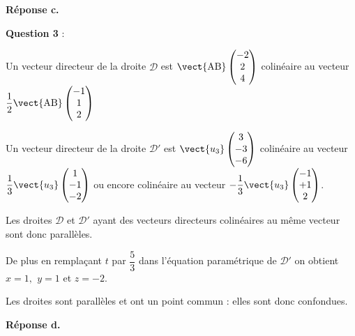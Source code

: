 \hfill\textbf{Réponse c.}

\medskip


\textbf{Question 3} : %

Un vecteur directeur de la droite $\mathcal{D}$ est $\vect{\text{AB}}\begin{pmatrix}-2\\2\\4\end{pmatrix}$ colinéaire au vecteur $\dfrac{1}{2}\vect{\text{AB}}\begin{pmatrix}-1\\1\\2\end{pmatrix}$

Un vecteur directeur de la droite $\mathcal{D}'$ est $\vect{u_3}\begin{pmatrix}3\\- 3\\-6\end{pmatrix}$ colinéaire au vecteur $\dfrac{1}{3}\vect{u_3}\begin{pmatrix}1\\- 1\\-2\end{pmatrix}$ ou encore colinéaire au vecteur $-\dfrac{1}{3}\vect{u_3}\begin{pmatrix}-1\\+ 1\\2\end{pmatrix}$.

Les droites $\mathcal{D}$ et $\mathcal{D}'$ ayant des vecteurs directeurs colinéaires au même vecteur sont donc parallèles.

De plus en remplaçant $t$ par $\dfrac{5}{3}$ dans l'équation paramétrique de $\mathcal{D}'$ on obtient $x = 1,~\, y = 1$ et $z = - 2$.

Les droites sont parallèles et ont un point commun : elles sont donc confondues.

\smallskip

\hfill\textbf{Réponse d.}

